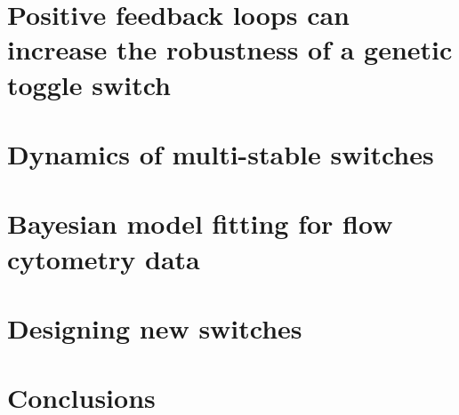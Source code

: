 \documentclass[]{phdthesis}
\begin{document}
\mainmatter*
\chapter{Positive feedback loops can increase the robustness of a genetic toggle switch}
\label{ch:abcsysbio}



\mainmatter*
 
\chapter{Dynamics of multi-stable switches}
\label{ch:SF}

%
%
%
%
%


\mainmatter*
\chapter{Bayesian model fitting for flow cytometry data}
\label{ch:Flow}

%
%

\mainmatter*
\chapter{Designing new switches}
\label{ch:desSw}


\mainmatter*
\chapter{Conclusions}
\label{ch:Conc}


\printbibliography 

\end{document}

